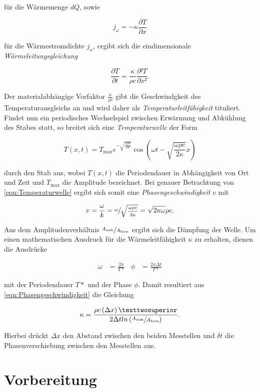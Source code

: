 für die Wärmemenge $dQ$, sowie

\begin{equation}
    j_\omega = -\kappa \frac{\partial{}T}{\partial{}x}
\end{equation}

für die Wärmestromdichte $j_\omega$, ergibt sich die eindimensionale \emph{Wärmeleitungsgleichung}

\begin{equation}
    \frac{\partial T}{\partial t} = \frac{\kappa}{\rho c} \frac{\partial² T}{\partial x²}.
\end{equation}

Der materialabhängige Vorfaktor $\frac{\kappa}{\rho c}$ gibt die Geschwindgkeit des Temperaturausgleichs 
an und wird daher als \emph{Temperaturleitfähigkeit} tituliert. \\
Findet nun ein periodisches Wechselspiel zwischen Erwärmung und Abkühlung des Stabes statt,
so breitet sich eine \emph{Temperaturwelle} der Form

\begin{equation}
\label{eqn:Temperaturwelle}
    T(x,t) = T_{\mathrm{max}} e^{-\sqrt{\frac{\omega \rho c}{2\kappa}}}\cos\left(\omega t - \sqrt{\frac{\omega \rho c}{2\kappa}}x\right)
\end{equation}

durch den Stab aus, wobei $T(x,t)$ die Periodendauer in Abhängigkeit von Ort und Zeit und $T_\text{max}$ die Amplitude bezeichnet.
Bei genauer Betrachtung von \eqref{eqn:Temperaturwelle} ergibt sich somit eine \emph{Phasengeschwindigkeit} $v$ mit 

\begin{equation}
\label{eqn:Phasengeschwindigkeit}
    v = \frac{\omega}{k} = \sfrac{\omega}{\sqrt{\frac{\omega \rho c}{2\kappa}}} = \sqrt{2\kappa \omega}{\rho c}.
\end{equation}

Aus dem Amplitudenverhältnis $\sfrac{A_\text{nah}}{A_\text{fern}}$ ergibt sich die Dämpfung der Welle. Um einen mathematischen Ausdruck 
für die Wärmeleitfähigkeit $\kappa$ zu erhalten, dienen die Ausdrücke 

\begin{align*}
    \omega &= \frac{2\pi}{T*} & \phi &= \frac{2\pi \Delta t}{T*}
\end{align*}

mit der Periodendauer $T*$ und der Phase $\phi$. Damit resultiert aus \eqref{eqn:Phasengeschwindigkeit} die Gleichung

\begin{equation}
    \kappa = \frac{\rho c \left(\Delta x\right)²}{2\Delta t ln\left(\sfrac{A_\text{nah}}{A_\text{fern}}\right)}.
\end{equation}

Hierbei drückt $\Delta x$ den Abstand zwischen den beiden Messtellen und $\delta t$ die Phasenverschiebung zwischen den Messtellen aus.


\section{Vorbereitung}
\label{sec:Vorbereitung}

\cite{sample}

